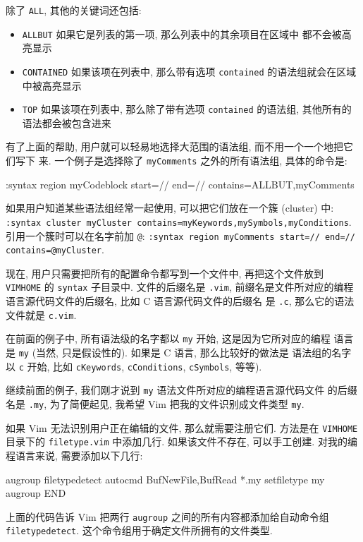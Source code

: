 除了 \texttt{ALL}, 其他的关键词还包括:
\begin{itemize}
    \item \texttt{ALLBUT} 如果它是列表的第一项, 那么列表中的其余项目在区域中
        都不会被高亮显示
    \item \texttt{CONTAINED} 如果该项在列表中, 那么带有选项 \texttt{contained}
        的语法组就会在区域中被高亮显示
    \item \texttt{TOP} 如果该项在列表中, 那么除了带有选项 \texttt{contained}
        的语法组, 其他所有的语法都会被包含进来
\end{itemize}

有了上面的帮助, 用户就可以轻易地选择大范围的语法组, 而不用一个一个地把它们写下
来. 一个例子是选择除了 \texttt{myComments} 之外的所有语法组, 具体的命令是:
\begin{vimcode}
:syntax region myCodeblock start=/{/ end=/}/ contains=ALLBUT,myComments
\end{vimcode}

\begin{tips}
    如果用户知道某些语法组经常一起使用, 可以把它们放在一个簇 (cluster) 中:
    \texttt{:syntax cluster myCluster
    contains=myKeywords,mySymbols,myConditions}. 引用一个簇时可以在名字前加
    \verb'@': \texttt{:syntax region myComments start=/\/\*/ end=/\*\//
        contains=@myCluster}.
\end{tips}

现在, 用户只需要把所有的配置命令都写到一个文件中, 再把这个文件放到
\texttt{VIMHOME} 的 \texttt{syntax} 子目录中. 文件的后缀名是 \texttt{.vim},
前缀名是文件所对应的编程语言源代码文件的后缀名, 比如 C 语言源代码文件的后缀名
是 \texttt{.c}, 那么它的语法文件就是 \texttt{c.vim}.

在前面的例子中, 所有语法级的名字都以 \texttt{my} 开始, 这是因为它所对应的编程
语言是 \texttt{my} (当然, 只是假设性的). 如果是 C 语言, 那么比较好的做法是
语法组的名字以 \texttt{c} 开始, 比如 \texttt{cKeywords}, \texttt{cConditions},
\texttt{cSymbols}, 等等).

继续前面的例子, 我们刚才说到 \texttt{my} 语法文件所对应的编程语言源代码文件
的后缀名是 \texttt{.my}, 为了简便起见, 我希望 Vim 把我的文件识别成文件类型
\texttt{my}.

如果 Vim 无法识别用户正在编辑的文件, 那么就需要注册它们. 方法是在
\texttt{VIMHOME} 目录下的 \texttt{filetype.vim} 中添加几行. 如果该文件不存在,
可以手工创建. 对我的编程语言来说, 需要添加以下几行:
\begin{vimcode}
augroup filetypedetect
autocmd BufNewFile,BufRead *.my setfiletype my
augroup END
\end{vimcode}
上面的代码告诉 Vim 把两行 \texttt{augroup} 之间的所有内容都添加给自动命令组
\texttt{filetypedetect}. 这个命令组用于确定文件所拥有的文件类型.

